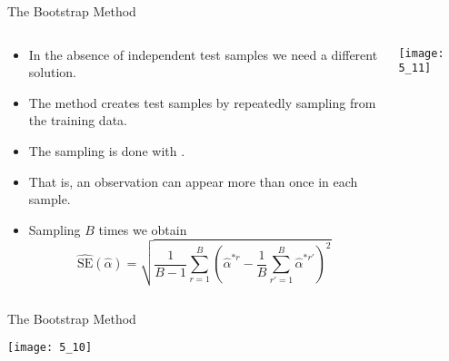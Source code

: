 \documentclass[mathserif, aspectratio=169]{beamer}
\begin{document}
\begin{frame}{The Bootstrap Method}
	\begin{columns}
		\begin{column}{0.5\textwidth}
			\begin{itemize}
				\item In the absence of independent test samples we need
					a different solution.
				\item The  method creates test samples by
					repeatedly sampling from the training data.
				\item The sampling is done with .
				\item That is, an observation can appear more than once
					in each sample.
				\item Sampling $B$ times we obtain
					{\footnotesize
					\[
						\widehat{\text{SE}}(\hat{\alpha}) =
						\sqrt{
							\frac{1}{B -1}
							\sum_{r=1}^B
							\left(
							\hat{\alpha}^{*r} -
								\frac{1}{B}
								\sum_{r' = 1}^B \hat{\alpha}^{*r'}
							\right)^2
						}
					\]}
			\end{itemize}
		\end{column}
		\begin{column}{0.5\textwidth}
			\begin{center}
				\texttt{[image: 5\_11]}
			\end{center}
		\end{column}
	\end{columns}
\end{frame}

\begin{frame}{The Bootstrap Method}
	\begin{center}
		\texttt{[image: 5\_10]}
	\end{center}
\end{frame}
\end{document}
